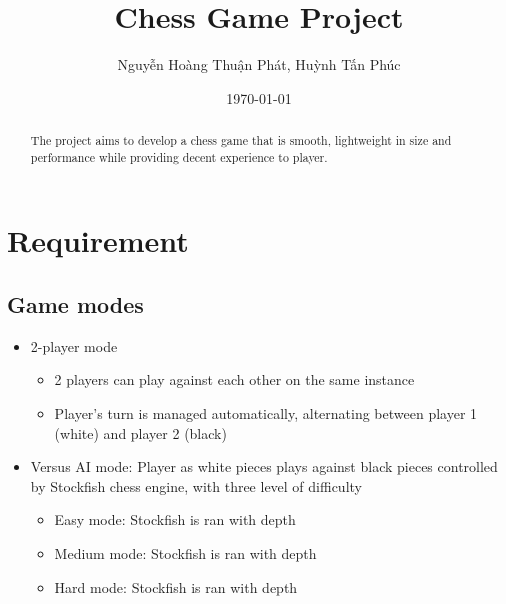 \documentclass[a4paper, 10pt, titlepage]{report}
\title{Chess Game Project}
\author{Nguyễn Hoàng Thuận Phát, Huỳnh Tấn Phúc}
\date{\selectlanguage{english}\today}
\begin{document}
\maketitle
{}
\renewcommand{\abstractname}{Overview}
\begin{abstract}
    The project aims to develop a chess game that is smooth, lightweight in size and performance while providing decent experience to player.
\end{abstract}

\tableofcontents
\chapter{Requirement}

\section{Game modes}
\begin{itemize}
    \item 2-player mode
          \begin{itemize}
              \item 2 players can play against each other on the same instance
              \item Player's turn is managed automatically, alternating between player 1 (white) and player 2 (black)
          \end{itemize}
    \item Versus AI mode: Player as white pieces plays against black pieces controlled by Stockfish chess engine, with three level of difficulty
          \begin{itemize}
              \item Easy mode: Stockfish is ran with depth
              \item Medium mode: Stockfish is ran with depth
              \item Hard mode: Stockfish is ran with depth
          \end{itemize}
\end{itemize}
\end{document}
